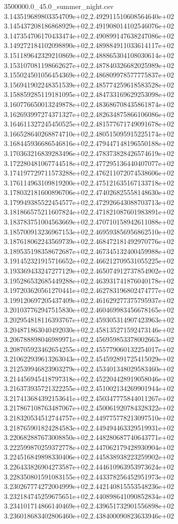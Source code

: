 \begin{filecontents*}{3500000.0_45.0_summer_night.csv}
3.143519689803354709e+02,2.492911510608564640e+02
3.145437208186868929e+02,2.491908014102546076e+02
3.147354706170433474e+02,2.490899147638247086e+02
3.149272184102098890e+02,2.489884911033614117e+02
3.151189642329210869e+02,2.488865304108030614e+02
3.153107081198662627e+02,2.487840326682025989e+02
3.155024501056454369e+02,2.486809978577775837e+02
3.156941902248351539e+02,2.485774259618583528e+02
3.158859285119181095e+02,2.484733169629253098e+02
3.160776650013249878e+02,2.483686708435861874e+02
3.162693997274371327e+02,2.482634875866106086e+02
3.164611327245450525e+02,2.481577671749091678e+02
3.166528640268874710e+02,2.480515095915225174e+02
3.168445936686546816e+02,2.479447148196550188e+02
3.170363216839283496e+02,2.478373828426574619e+02
3.172280481067744518e+02,2.477295136440407077e+02
3.174197729711573288e+02,2.476211072074538606e+02
3.176114963109819200e+02,2.475121635167133718e+02
3.178032181600896706e+02,2.474026825558148630e+02
3.179949385522454577e+02,2.472926643088703713e+02
3.181866575211607824e+02,2.471821087601983891e+02
3.183783751004563669e+02,2.470710158942611088e+02
3.185700913236967153e+02,2.469593856956862510e+02
3.187618062243569739e+02,2.468472181492970776e+02
3.189535198358672687e+02,2.467345132400459988e+02
3.191452321915716652e+02,2.466212709531055225e+02
3.193369433247277129e+02,2.465074912737854902e+02
3.195286532685449288e+02,2.463931741876040178e+02
3.197203620561270441e+02,2.462783196802474777e+02
3.199120697205437409e+02,2.461629277375795937e+02
3.201037762947515830e+02,2.460469983456678165e+02
3.202954818116393767e+02,2.459305314907423963e+02
3.204871863040492030e+02,2.458135271592473146e+02
3.206788898046989971e+02,2.456959853378002663e+02
3.208705923462654255e+02,2.455779060132254017e+02
3.210622939613263043e+02,2.454592891725415029e+02
3.212539946823903279e+02,2.453401348029583460e+02
3.214456945418797318e+02,2.452204428919058046e+02
3.216373935721322255e+02,2.451002134269901944e+02
3.217413684392153641e+02,2.450347775844011267e+02
3.217867108763487067e+02,2.450061920784328322e+02
3.218320534512744757e+02,2.449775778213097510e+02
3.218765901824284583e+02,2.449494463329519931e+02
3.220682887673008850e+02,2.448280687740643771e+02
3.222599870259372778e+02,2.447062179428930904e+02
3.224516849898330406e+02,2.445838938223259902e+02
3.226433826904273587e+02,2.444610963953973624e+02
3.228350801591083155e+02,2.443378256452951973e+02
3.230267774272004999e+02,2.442140815553548236e+02
3.232184745259675651e+02,2.440898641090852834e+02
3.234101714866140469e+02,2.439651732901556898e+02
3.236018683402806460e+02,2.438400090823633946e+02

\end{filecontents*}
